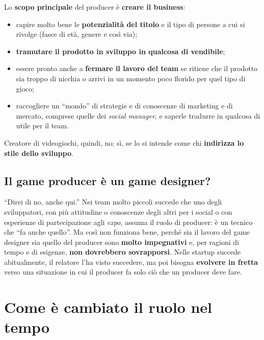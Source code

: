 Lo \textbf{scopo principale} del producer è \textbf{creare il business}:
\begin{itemize}
  \item capire molto bene le \textbf{potenzialità del titolo} e il tipo di
        persone a cui si rivolge (fasce di età, genere e così via);
  \item \textbf{tramutare il prodotto in sviluppo in qualcosa di vendibile};
  \item essere pronto anche a \textbf{fermare il lavoro del team} se ritiene che
        il prodotto sia troppo di nicchia o arrivi in un momento poco florido
        per quel tipo di gioco;
  \item raccogliere un ``mondo'' di strategie e di conoscenze di marketing e di
        mercato, comprese quelle dei \emph{social manager}, e saperle tradurre
        in qualcosa di utile per il team.
\end{itemize}
Creatore di videogiochi, quindi, no; sì, se lo si intende come chi
\textbf{indirizza lo stile dello sviluppo}.

\subsection{Il game producer è un game designer?}

``Direi di no, anche qui.'' Nei team molto piccoli succede che uno degli
sviluppatori, con più attitudine o conoscenze degli altri per i social o con
esperienze di partecipazione agli \emph{expo}, assuma il ruolo di producer: è un
tecnico che ``fa anche quello''. Ma così non funziona bene, perché sia il lavoro
del game designer sia quello del producer sono \textbf{molto impegnativi} e, per
ragioni di tempo e di esigenze, \textbf{non dovrebbero sovrapporsi}. Nelle
startup succede abitualmente, il relatore l'ha visto succedere, ma poi bisogna
\textbf{evolvere in fretta} verso una situazione in cui il producer fa solo ciò
che un producer deve fare.

\section{Come è cambiato il ruolo nel tempo}
\label{sec:z5-storia}

